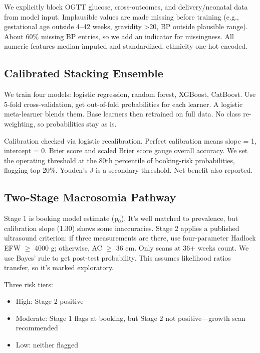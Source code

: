 \documentclass[conference]{IEEEtran}
\begin{document}
We explicitly block OGTT glucose, cross-outcomes, and delivery/neonatal data from model input. Implausible values are made missing before training (e.g., gestational age outside 4--42 weeks, gravidity >20, BP outside plausible range). About 60\% missing BP entries, so we add an indicator for missingness. All numeric features median-imputed and standardized, ethnicity one-hot encoded.



\subsection{Calibrated Stacking Ensemble}

We train four models: logistic regression, random forest, XGBoost, CatBoost. Use 5-fold cross-validation, get out-of-fold probabilities for each learner. A logistic meta-learner blends them. Base learners then retrained on full data. No class re-weighting, so probabilities stay as is.



Calibration checked via logistic recalibration. Perfect calibration means slope = 1, intercept = 0. Brier score and scaled Brier score gauge overall accuracy. We set the operating threshold at the 80th percentile of booking-risk probabilities, flagging top 20\%. Youden's J is a secondary threshold. Net benefit also reported.



\subsection{Two-Stage Macrosomia Pathway}

Stage 1 is booking model estimate (p$_{0}$). It's well matched to prevalence, but calibration slope (1.30) shows some inaccuracies. Stage 2 applies a published ultrasound criterion: if three measurements are there, use four-parameter Hadlock EFW \ensuremath{\geq} 4000 g; otherwise, AC \ensuremath{\geq} 36 cm. Only scans at 36+ weeks count. We use Bayes' rule to get post-test probability. This assumes likelihood ratios transfer, so it's marked exploratory.



Three risk tiers:



\begin{itemize}

\item High: Stage 2 positive

\item Moderate: Stage 1 flags at booking, but Stage 2 not positive---growth scan recommended

\item Low: neither flagged

\end{itemize}
\end{document}

